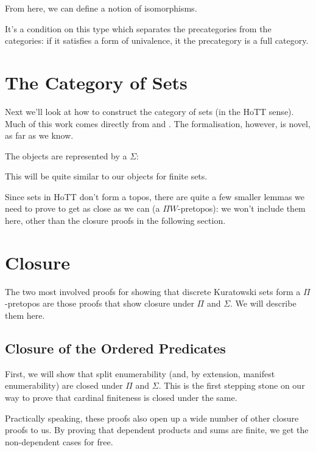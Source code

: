 From here, we can define a notion of isomorphisms.
\begin{agdalisting}
\end{agdalisting}
It's a condition on this type which separates the precategories from the
categories: if it satisfies a form of univalence, it the precategory is a full
category.
\begin{agdalisting}
\end{agdalisting}
\section{The Category of Sets}
Next we'll look at how to construct the category of sets (in the HoTT sense).
Much of this work comes directly from \citet[chapter 10]{hottbook} and
\citet{rijkeSetsHomotopyType2015}.
The formalisation, however, is novel, as far as we know.

The objects are represented by a \(\Sigma\):
\begin{agdalisting}
\end{agdalisting}
This will be quite similar to our objects for finite sets.

Since sets in HoTT don't form a topos, there are quite a few smaller lemmas we
need to prove to get as close as we can (a \(\Pi W\)-pretopos): we won't include
them here, other than the closure proofs in the following section.
\section{Closure}
The two most involved proofs for showing that discrete Kuratowski sets form a
\(\Pi\)-pretopos are those proofs that show closure under \(\Pi\) and
\(\Sigma\).
We will describe them here.
\subsection{Closure of the Ordered Predicates}
First, we will show that split enumerability (and, by extension, manifest
enumerability) are closed under \(\Pi\) and \(\Sigma\).
This is the first stepping stone on our way to prove that cardinal finiteness is
closed under the same.

Practically speaking, these proofs also open up a wide number of other closure
proofs to us.
By proving that dependent products and sums are finite, we get the non-dependent
cases for free.

